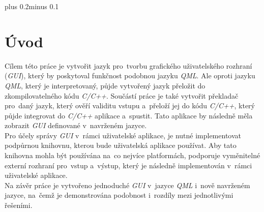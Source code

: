 \documentclass[11pt,twoside,a4paper]{book}
\begin{document}
\noindent




\setcounter{secnumdepth}{2}
\setcounter{tocdepth}{1}
\tableofcontents


\listoffigures




\mainbodystarts
\normalfont
{}\baselineskip plus 0.2\baselineskip minus 0.1\baselineskip




\chapter{\label{CH:Intro}Úvod}
Cílem této práce je vytvořit jazyk pro~tvorbu grafického uživatelského rozhraní (\textit{GUI}), který by poskytoval funkčnost podobnou jazyku \textit{QML}. Ale oproti jazyku \textit{QML}, který je interpretovaný, půjde vytvořený jazyk přeložit do zkompilovatelného kódu \textit{C/C++}. Součástí práce je také vytvořit překladač pro~daný jazyk, který ověří validitu vstupu a~přeloží jej do kódu \textit{C/C++}, který půjde integrovat do \textit{C/C++} aplikace a~spustit. Tato aplikace by následně měla zobrazit \textit{GUI} definované v~navrženém jazyce.\\
Pro účely správy \textit{GUI} v~rámci uživatelské aplikace, je nutné implementovat podpůrnou knihovnu, kterou bude uživatelská aplikace používat. Aby tato knihovna mohla být používána na~co nejvíce platformách, podporuje vyměnitelné externí rozhraní pro~vstup a~výstup, který je následně implementován v~rámci uživatelské aplikace.\\
Na závěr práce je vytvořeno jednoduché \textit{GUI} v~jazyce \textit{QML} i~nově navrženém jazyce, na~čemž je demonstrována podobnost i~rozdíly mezi jednotlivými řešeními.
\end{document}
